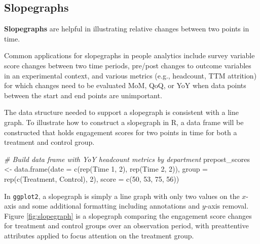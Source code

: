 \documentclass[
]{book}
\newenvironment{Shaded}{\begin{snugshade}}{\end{snugshade}}
\newcommand{\AttributeTok}[1]{\textcolor[rgb]{0.77,0.63,0.00}{#1}}
\newcommand{\CommentTok}[1]{\textcolor[rgb]{0.56,0.35,0.01}{\textit{#1}}}
\newcommand{\DecValTok}[1]{\textcolor[rgb]{0.00,0.00,0.81}{#1}}
\newcommand{\FunctionTok}[1]{\textcolor[rgb]{0.00,0.00,0.00}{#1}}
\newcommand{\NormalTok}[1]{#1}
\newcommand{\OtherTok}[1]{\textcolor[rgb]{0.56,0.35,0.01}{#1}}
\newcommand{\StringTok}[1]{\textcolor[rgb]{0.31,0.60,0.02}{#1}}
\begin{document}
\hypertarget{slopegraphs}{%
\subsection{Slopegraphs}\label{slopegraphs}}

\textbf{Slopegraphs} are helpful in illustrating relative changes between two points in time.

Common applications for slopegraphs in people analytics include survey variable score changes between two time periods, pre/post changes to outcome variables in an experimental context, and various metrics (e.g., headcount, TTM attrition) for which changes need to be evaluated MoM, QoQ, or YoY when data points between the start and end points are unimportant.

The data structure needed to support a slopegraph is consistent with a line graph. To illustrate how to construct a slopegraph in R, a data frame will be constructed that holds engagement scores for two points in time for both a treatment and control group.

\begin{Shaded}
\begin{Highlighting}[]
\CommentTok{\# Build data frame with YoY headcount metrics by department}
\NormalTok{prepost\_scores }\OtherTok{\textless{}{-}} \FunctionTok{data.frame}\NormalTok{(}\AttributeTok{date =} \FunctionTok{c}\NormalTok{(}\FunctionTok{rep}\NormalTok{(}\StringTok{\textquotesingle{}Time 1\textquotesingle{}}\NormalTok{, }\DecValTok{2}\NormalTok{), }\FunctionTok{rep}\NormalTok{(}\StringTok{\textquotesingle{}Time 2\textquotesingle{}}\NormalTok{, }\DecValTok{2}\NormalTok{)),}
                             \AttributeTok{group =} \FunctionTok{rep}\NormalTok{(}\FunctionTok{c}\NormalTok{(}\StringTok{\textquotesingle{}Treatment\textquotesingle{}}\NormalTok{, }\StringTok{\textquotesingle{}Control\textquotesingle{}}\NormalTok{), }\DecValTok{2}\NormalTok{),}
                             \AttributeTok{score =} \FunctionTok{c}\NormalTok{(}\DecValTok{50}\NormalTok{, }\DecValTok{53}\NormalTok{, }\DecValTok{75}\NormalTok{, }\DecValTok{56}\NormalTok{))}
\end{Highlighting}
\end{Shaded}

In \texttt{ggplot2}, a slopegraph is simply a line graph with only two values on the \(x\)-axis and some additional formatting including annotations and \(y\)-axis removal. Figure \ref{fig:slopegraph} is a slopegraph comparing the engagement score changes for treatment and control groups over an observation period, with preattentive attributes applied to focus attention on the treatment group.
\end{document}
